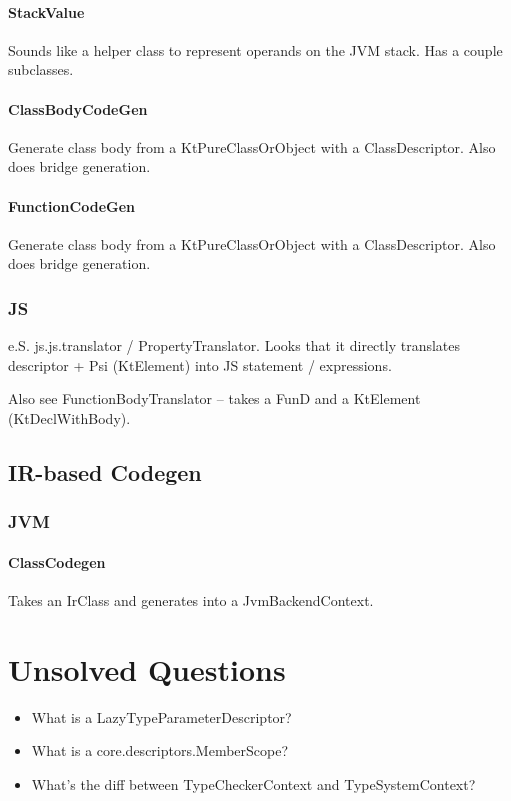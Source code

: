 \documentclass{article}
\begin{document}
\paragraph{StackValue}
Sounds like a helper class to represent operands on the JVM stack. Has a couple subclasses.

\paragraph{ClassBodyCodeGen}
Generate class body from a KtPureClassOrObject with a ClassDescriptor. Also does bridge generation.

\paragraph{FunctionCodeGen}
Generate class body from a KtPureClassOrObject with a ClassDescriptor. Also does bridge generation.

\subsubsection{JS}

e.S. js.js.translator / PropertyTranslator. Looks that it directly translates descriptor + Psi (KtElement) into JS statement / expressions.

Also see FunctionBodyTranslator -- takes a FunD and a KtElement (KtDeclWithBody).

\subsection{IR-based Codegen}

\subsubsection{JVM}

\paragraph{ClassCodegen}
Takes an IrClass and generates into a JvmBackendContext.

\section{Unsolved Questions}

\begin{itemize}
    \item What is a LazyTypeParameterDescriptor?
    \item What is a core.descriptors.MemberScope?
    \item What's the diff between TypeCheckerContext and TypeSystemContext?
\end{itemize}


\newpage
\printnomenclature
\end{document}
